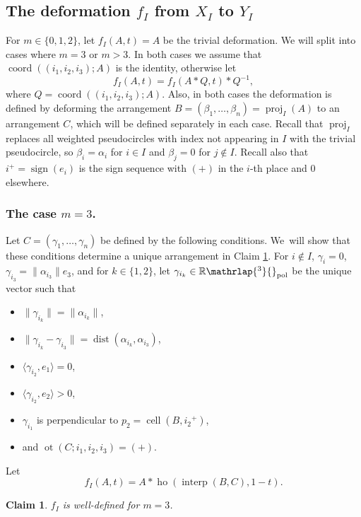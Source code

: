 \documentclass[JEP,XML,SOM,Unicode,NoFloatCountersInSection,published]{cedram}
\newtheorem{claim}[theorem]{Claim}
\theoremstyle{remark}
\let\mb\mathbb
\DeclareMathOperator{\sign}{sign}
\DeclareMathOperator{\dist}{dist}
\DeclareMathOperator{\cell}{cell}
\newcommand{\Rpol}[1]{\mb{R}\mathrlap{{}^{#1}}{}_\text{pol}}
\DeclareMathOperator{\proj}{proj}
\DeclareMathOperator{\interp}{interp}
\DeclareMathOperator{\coord}{coord}
\DeclareMathOperator{\ho}{ho}
\DeclareMathOperator{\ot}{ot}
\begin{document}
\subsection{The deformation $f_I$ from $X_I$ to $Y_I$}
\label{subsubsec-f}

For $m \in \{0,1,2\}$, let $f_I(A,t) = A$ be the trivial deformation.
We will split into cases where $m=3$ or $m >3$.
In both cases we assume that $\coord((i_1,i_2,i_3);A)$ is the identity, otherwise let
\[
f_I(A,t) = f_I(A*Q,t)*Q^{-1},
\]
where $Q = \coord((i_1,i_2,i_3);A)$.
Also, in both cases the deformation is defined by deforming the arrangement $B = (\beta_1,\dots,\beta_n) = \proj_I(A)$ to an arrangement $C$, which will be defined separately in each case. Recall that $\proj_I$ replaces all weighted pseudocircles with index not appearing in $I$ with the trivial pseudocircle, so $\beta_i = \alpha_i$ for $i \in I$ and $\beta_j = 0$ for $j \not\in I$.
Recall also that $i^+ = \sign(e_i)$ is the sign sequence with $(+)$ in the $i$-th place and $0$ elsewhere.

\subsubsection*{The case $m=3$.}
Let $C = (\gamma_1,\dots,\gamma_n)$ be defined by the following conditions. We~will show that these conditions determine a unique arrangement in Claim \ref{claim-well-defined-f3}.
For $i \not\in I$, $\gamma_i = 0$,
$\gamma_{i_3} = \|\alpha_{i_3}\|e_3$,
and for $k \in \{1,2\}$,
let
$\gamma_{i_k} \in \Rpol{3}$ be the unique vector such that
\begin{itemize}
\item
$\|\gamma_{i_k}\| = \|\alpha_{i_k}\|$,
\item
$\|\gamma_{i_k} -\gamma_{i_3}\| = \dist(\alpha_{i_k},\alpha_{i_3})$,
\item
$\langle \gamma_{i_2}, e_1 \rangle = 0$,
\item
$\langle \gamma_{i_2}, e_2 \rangle > 0$,
\item
$\gamma_{i_1}$ is perpendicular to $p_2 = \cell(B,{i_2}^+)$,
\item
and $\ot(C;i_1,i_2,i_3) = (+)$.
\end{itemize}
Let
\[ f_{I}(A,t) = A*\ho(\interp(B,C),1-t).\]

\begin{claim}\label{claim-well-defined-f3}
$f_I$ is well-defined for $m=3$.
\end{claim}
\end{document}
